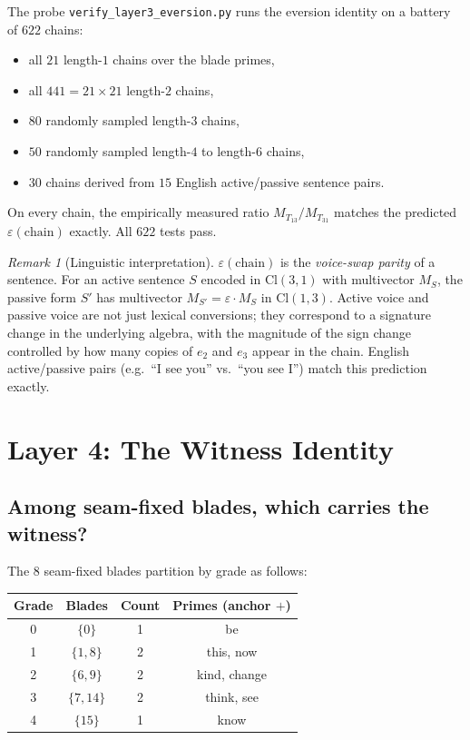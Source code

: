 \documentclass[11pt,a4paper]{article}
\theoremstyle{plain}
\theoremstyle{definition}
\theoremstyle{remark}
\newtheorem{remark}[theorem]{Remark}
\numberwithin{equation}{section}
\providecommand{\Cl}{\mathrm{Cl}}
\providecommand{\eps}{\varepsilon}
\begin{document}
The probe \texttt{verify\_layer3\_eversion.py} runs the eversion
identity on a battery of $622$ chains:
\begin{itemize}
\item all $21$ length-$1$ chains over the blade primes,
\item all $441 = 21 \times 21$ length-$2$ chains,
\item $80$ randomly sampled length-$3$ chains,
\item $50$ randomly sampled length-$4$ to length-$6$ chains,
\item $30$ chains derived from $15$ English active/passive
      sentence pairs.
\end{itemize}
On every chain, the empirically measured ratio
$M_{T_{13}} / M_{T_{31}}$ matches the predicted
$\eps(\mathrm{chain})$ exactly.  All $622$ tests pass.

\begin{remark}[Linguistic interpretation]
$\eps(\mathrm{chain})$ is the \emph{voice-swap parity} of a
sentence.  For an active sentence $S$ encoded in $\Cl(3,1)$ with
multivector $M_S$, the passive form $S'$ has multivector
$M_{S'} = \eps \cdot M_S$ in $\Cl(1,3)$.  Active voice and passive
voice are not just lexical conversions; they correspond to a
signature change in the underlying algebra, with the magnitude of
the sign change controlled by how many copies of $e_2$ and $e_3$
appear in the chain.  English active/passive pairs (e.g.\
``\textsf{I see you}'' vs.\ ``\textsf{you see I}'') match this
prediction exactly.
\end{remark}


\section{Layer 4: The Witness Identity}\label{sec:layer4}

\subsection{Among seam-fixed blades, which carries the witness?}

The $8$ seam-fixed blades partition by grade as follows:
\begin{center}
\begin{tabular}{cccc}
\toprule
Grade & Blades & Count & Primes (anchor $+$) \\
\midrule
0 & $\{0\}$ & 1 & \textsf{be} \\
1 & $\{1, 8\}$ & 2 & \textsf{this}, \textsf{now} \\
2 & $\{6, 9\}$ & 2 & \textsf{kind}, \textsf{change} \\
3 & $\{7, 14\}$ & 2 & \textsf{think}, \textsf{see} \\
4 & $\{15\}$ & 1 & \textsf{know} \\
\bottomrule
\end{tabular}
\end{center}
\end{document}
